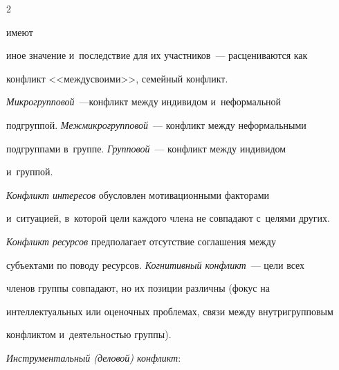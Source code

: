 \begin{multicols}{2}





\noindent

 имеют 

иное значение и~последствие для их участников~--- расцениваются как 

конфликт <<между\linebreak своими>>, семейный конфликт.  

\textit{Микрогрупповой}~---\linebreak конфликт между индивидом и~неформальной 

подгруппой. \textit{Меж\-мик\-ро\-груп\-по\-вой}~--- конфликт между неформальными 

подгруппами в~группе. \textit{Груп\-по\-вой}~--- конфликт между индивидом 

и~группой.

  

  \textit{Конфликт интересов} обусловлен мотивационными факторами 

и~ситуацией, в~которой цели каж\-до\-го члена не совпадают с~целями других. 

\textit{Конфликт ресурсов} предполагает отсутствие соглашения между 

субъектами по поводу ресурсов. \textit{Когнитивный конфликт}~--- цели всех 

членов группы совпадают, но их позиции различны (фокус на 

интеллектуальных или оценочных проблемах, связи между внутригрупповым 

конфликтом и~дея\-тель\-ностью группы).



\vspace*{5pt}

  

  \textit{Инструментальный (деловой) конфликт}:\\[-16pt]

\end{multicols}
